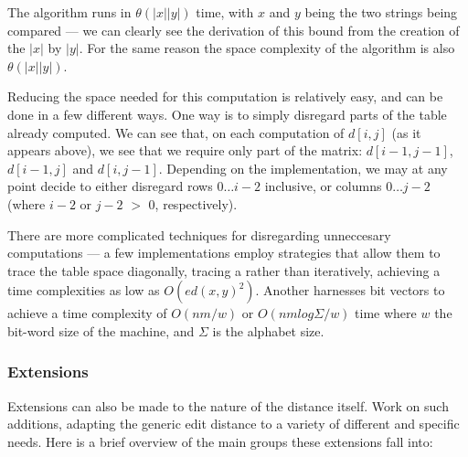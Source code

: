 \documentclass[a4paper,11pt,twoside,notitlepage]{article}
\begin{document}
        The algorithm runs in $\theta (|x||y|)$ time, with $x$ and
        $y$ being the two strings being compared --- we can clearly
        see the derivation of this bound from the creation of the
        $|x|$ by $|y|$. For the same reason the space complexity of
        the algorithm is also $\theta (|x||y|)$.

        Reducing the space needed for this computation is relatively
        easy, and can be done in a few different ways. One way is to
        simply disregard parts of the table already computed. We can
        see that, on each computation of $d[i,j]$ (as it appears
        above), we see that we require only part of the matrix:
        $d[i-1,j-1]$, $d[i-1,j]$ and $d[i,j-1]$. Depending on the
        implementation, we may at any point decide to either disregard
        rows $0 \dots i-2$ inclusive, or columns $0 \dots j-2$ (where
        $i-2$ or $j-2$ $>$ $0$, respectively). 

        There are more complicated techniques for disregarding
        unneccesary computations --- a few implementations employ
        strategies that allow them to trace the table space
        diagonally, tracing a rather than iteratively, achieving a
        time complexities as low as $O(ed(x, y)^2)$.\cite{Chang1992}
        Another harnesses bit vectors to achieve a time complexity of
        $O(nm/w)$ or $O(nm log {\Sigma}/w)$ time where $w$ the
        bit-word size of the machine, and $\Sigma$ is the alphabet
        size.\cite{Myers1999}\cite{Hyyro2003}

        \subsubsection*{Extensions}
        Extensions can also be made to the nature of the distance
        itself. Work on such additions, adapting the generic edit
        distance to a variety of different and specific needs. Here is
        a brief overview of the main groups these extensions fall
        into:
\end{document}
